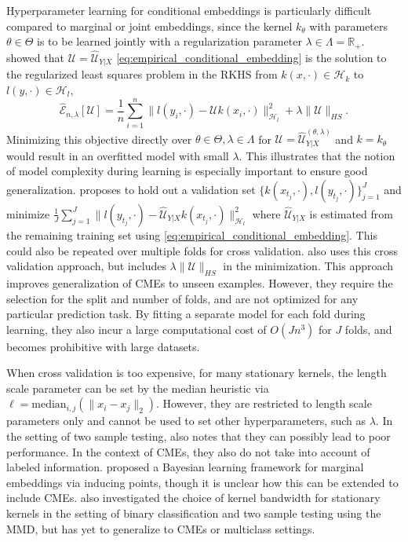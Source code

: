 \documentclass[twoside]{article}
\begin{document}
			Hyperparameter learning for conditional embeddings is particularly difficult compared to marginal or joint embeddings, since the kernel $k_{\theta}$ with parameters $\theta \in \Theta$ is to be learned jointly with a regularization parameter $\lambda \in \Lambda = \mathbb{R}_{+}$. \cite{lever2012conditional} showed that $\mathcal{U} = \hat{\mathcal{U}}_{Y | X}$ \eqref{eq:empirical_conditional_embedding} is the solution to the regularized least squares problem in the RKHS from $k(x, \cdot) \in \mathcal{H}_{k}$ to $l(y, \cdot) \in \mathcal{H}_{l}$, 
			\begin{equation}
				\hat{\mathcal{E}}_{n, \lambda}[\mathcal{U}] = \frac{1}{n} \sum_{i = 1}^{n} \big\| l(y_{i}, \cdot) - \mathcal{U} k(x_{i}, \cdot) \big\|_{\mathcal{H}_{l}}^{2} + \lambda \| \mathcal{U} \|_{HS}.
			\label{eq:lever_objective}
			\end{equation}
			Minimizing this objective directly over $\theta \in \Theta, \lambda \in \Lambda$ for $\mathcal{U} = \hat{\mathcal{U}}^{(\theta, \lambda)}_{Y | X}$ and $k = k_{\theta}$ would result in an overfitted model with small $\lambda$. This illustrates that the notion of model complexity during learning is especially important to ensure good generalization. \cite{lever2012conditional} proposes to hold out a validation set $\{k(x_{t_{j}}, \cdot), l(y_{t_{j}}, \cdot)\}_{j = 1}^{J}$ and minimize $\frac{1}{J} \sum_{j = 1}^{J} \big\| l(y_{t_{j}}, \cdot) - \hat{\mathcal{U}}_{Y | X} k(x_{t_{j}}, \cdot) \big\|_{\mathcal{H}_{l}}^{2}$ where $\hat{\mathcal{U}}_{Y | X}$ is estimated from the remaining training set using \eqref{eq:empirical_conditional_embedding}. This could also be repeated over multiple folds for cross validation. \cite{song2013kernel} also uses this cross validation approach, but includes $\lambda \| \mathcal{U} \|_{HS}$ in the minimization. This approach improves generalization of \glspl{CME} to unseen examples. However, they require the selection for the split and number of folds, and are not optimized for any particular prediction task. By fitting a separate model for each fold during learning, they also incur a large computational cost of $O(J n^{3})$ for $J$ folds, and becomes prohibitive with large datasets.
			
			When cross validation is too expensive, for many stationary kernels, the length scale parameter can be set by the median heuristic \citep{muandet2016kernel} via $\ell = \mathrm{median}_{i, j}(\| x_{i} - x_{j} \|_{2})$. However, they are restricted to length scale parameters only and cannot be used to set other hyperparameters, such as $\lambda$. In the setting of two sample testing, \cite{gretton2012optimal} also notes that they can possibly lead to poor performance. In the context of \glspl{CME}, they also do not take into account of labeled information. \cite{flaxman2016bayesian} proposed a Bayesian learning framework for marginal embeddings via inducing points, though it is unclear how this can be extended to include \glspl{CME}. \cite{fukumizu2009kernel} also investigated the choice of kernel bandwidth for stationary kernels in the setting of binary classification and two sample testing using the \gls{MMD}, but has yet to generalize to \glspl{CME} or multiclass settings.
\end{document}

